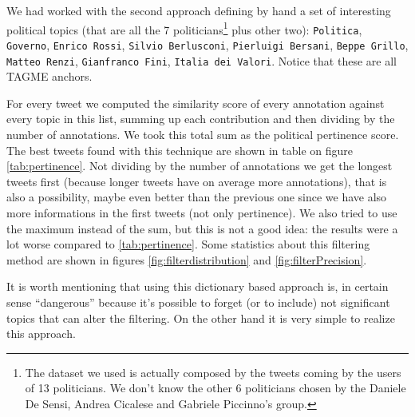 \documentclass[a4paper,11pt,oneside]{article}
\begin{document}
We had worked with the second approach defining by hand a set of interesting political topics (that are all the 7 politicians\footnote{The dataset we used is actually composed by the tweets coming by the users of 13 politicians. We don't know the other 6 politicians chosen by the Daniele De Sensi, Andrea Cicalese and Gabriele Piccinno's group.} plus other two): \texttt{Politica}, \texttt{Governo}, \texttt{Enrico Rossi}, \texttt{Silvio Berlusconi}, \texttt{Pierluigi Bersani}, \texttt{Beppe Grillo}, \texttt{Matteo Renzi}, \texttt{Gianfranco Fini}, \texttt{Italia dei Valori}. Notice that these are all TAGME anchors.

For every tweet we computed the similarity score of every annotation against every topic in this list, summing up each contribution and then dividing by the number of annotations. We took this total sum as the political pertinence score. The best tweets found with this technique are shown in table on figure \ref{tab:pertinence}.
Not dividing by the number of annotations we get the longest tweets first (because longer tweets have on average more annotations), that is also a possibility, maybe even better than the previous one since we have also more informations in the first tweets (not only pertinence). We also tried to use the maximum instead of the sum, but this is not a good idea: the results were a lot worse compared to \ref{tab:pertinence}. Some statistics about this filtering method are shown in figures \ref{fig:filterdistribution} and \ref{fig:filterPrecision}.

It is worth mentioning that using this dictionary based approach is, in certain sense ``dangerous'' because it's possible to forget (or to include) not significant topics that can alter the filtering. On the other hand it is very simple to realize this approach.
\end{document}

